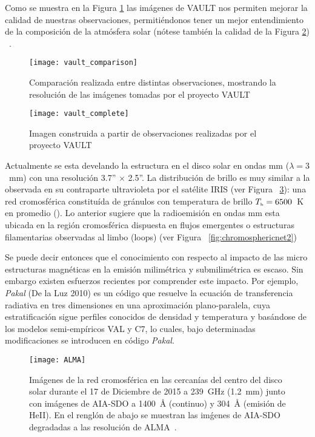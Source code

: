 Como se muestra en la Figura \ref{fig:vault_compare} las im\'agenes de VAULT nos permiten mejorar la calidad de nuestras observaciones, permiti\'endonos tener un mejor entendimiento de la composici\'on de la atm\'osfera solar (n\'otese tambi\'en la calidad de la Figura \ref{fig:vault_complete}) ~\citep{VAULT1}.

\begin{figure}[ht]
\centering
\texttt{[image: vault\_comparison]}
\caption{Comparaci\'on realizada entre distintas observaciones, mostrando la resoluci\'on de las im\'agenes tomadas por el proyecto VAULT}
\label{fig:vault_compare}
\end{figure}

\begin{figure}[ht]
\centering
\texttt{[image: vault\_complete]}
\caption{Imagen construida a partir de observaciones realizadas por el proyecto VAULT}
\label{fig:vault_complete}
\end{figure}

Actualmente se esta develando la estructura en el disco solar en ondas mm ($\lambda=3$~mm) con una resoluci\'on 3.7'' $\times$ 2.5''\citep{2018A&A...619L...6N}. La distribuci\'on de brillo es muy similar a la observada en su contraparte ultravioleta por el sat\'elite IRIS (ver Figura ~\ref{fig:chromosphericnet1}): una red cromosf\'erica constitu\'ida de gr\'anulos con temperatura de brillo $T_{\tiny{\mbox{b}}}=6500$~K en promedio (\citep{2018A&A...619L...6N}). Lo anterior sugiere que la radioemisi\'on en ondas mm esta  ubicada en la regi\'on cromosf\'erica dispuesta en flujos emergentes o estructuras filamentarias observadas al limbo (loops) (ver Figura ~\ref{fig:chromosphericnet2})

Se puede decir entonces que el conocimiento con respecto al impacto de las micro estructuras magn\'eticas en la emisi\'on milim\'etrica y submilim\'etrica es escaso. Sin embargo existen esfuerzos recientes por comprender este impacto. Por ejemplo, \emph{Pakal} (De la Luz 2010) es un c\'odigo que resuelve la ecuaci\'on de transferencia radiativa en tres dimensiones en una aproximaci\'on plano-paralela, cuya estratificaci\'on sigue perfiles conocidos de densidad y temperatura y bas\'andose de los modelos semi-emp\'iricos VAL y C7, lo cuales, bajo determinadas modificaciones se introducen en c\'odigo \emph{Pakal}.

\begin{figure}[ht]
\centering
\texttt{[image: ALMA]}
\caption{Im\'agenes de la red cromosf\'erica en las cercan\'ias del centro del disco solar durante el 17 de Diciembre de 2015 a 239~GHz (1.2~mm) junto con im\'agenes de AIA-SDO a 1400~$\mbox{\AA}$ (continuo) y 304~$\mbox{\AA}$ (emisi\'on de HeII). En el rengl\'on de abajo se muestran las im\'genes de AIA-SDO degradadas a las resoluci\'on de ALMA~\citep{2017A&A...605A..78A}.}
\label{fig:chromosphericnet1}
\end{figure}


